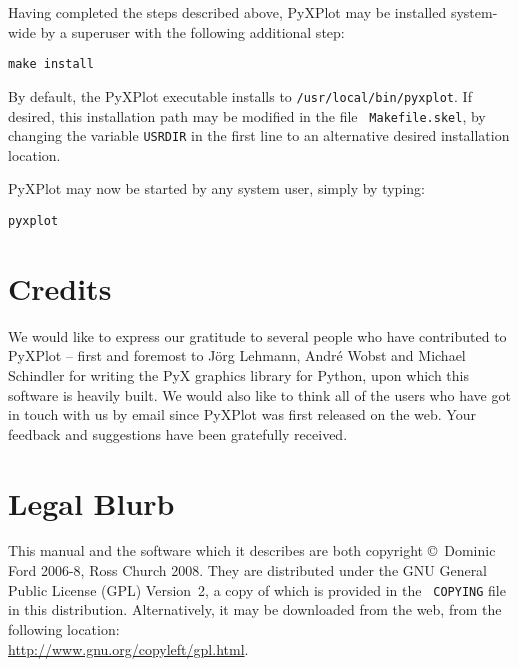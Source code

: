 Having completed the steps described above, PyXPlot may be installed
system-wide by a superuser with the following additional
step:

\begin{verbatim}
make install
\end{verbatim}

By default, the PyXPlot executable installs to {\tt /usr/local/bin/pyxplot}.
If desired, this installation path may be modified in the file {\tt
Makefile.skel}, by changing the variable {\tt USRDIR} in the first line to an
alternative desired installation location.

PyXPlot may now be started by any system user, simply by typing:

\begin{verbatim}
pyxplot
\end{verbatim}

\section{Credits}

We would like to express our gratitude to several people who have contributed
to PyXPlot -- first and foremost to J\"org Lehmann,
Andr\'e Wobst and Michael Schindler for writing the PyX graphics library for Python, upon which
this software is heavily built. We would also like to think all of the users
who have got in touch with us by email since PyXPlot was first released on the
web.  Your feedback and suggestions have been gratefully received.

\section{Legal Blurb}

This manual and the software which it describes are both copyright \copyright\
Dominic Ford 2006-8, Ross Church 2008. They are distributed under the GNU
General Public License (GPL) Version~2, a copy of which is provided in the {\tt
COPYING} file in this distribution. Alternatively, it may be downloaded from the web, from
the following location:\\ \url{http://www.gnu.org/copyleft/gpl.html}.

